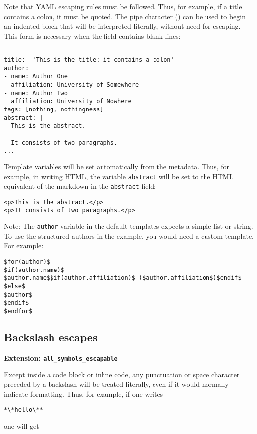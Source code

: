 \documentclass[]{article}
\begin{document}
Note that YAML escaping rules must be followed. Thus, for example, if a
title contains a colon, it must be quoted. The pipe character
(\texttt{\textbar{}}) can be used to begin an indented block that will
be interpreted literally, without need for escaping. This form is
necessary when the field contains blank lines:

\begin{verbatim}
---
title:  'This is the title: it contains a colon'
author:
- name: Author One
  affiliation: University of Somewhere
- name: Author Two
  affiliation: University of Nowhere
tags: [nothing, nothingness]
abstract: |
  This is the abstract.

  It consists of two paragraphs.
...
\end{verbatim}

Template variables will be set automatically from the metadata. Thus,
for example, in writing HTML, the variable \texttt{abstract} will be set
to the HTML equivalent of the markdown in the \texttt{abstract} field:

\begin{verbatim}
<p>This is the abstract.</p>
<p>It consists of two paragraphs.</p>
\end{verbatim}

Note: The \texttt{author} variable in the default templates expects a
simple list or string. To use the structured authors in the example, you
would need a custom template. For example:

\begin{verbatim}
$for(author)$
$if(author.name)$
$author.name$$if(author.affiliation)$ ($author.affiliation$)$endif$
$else$
$author$
$endif$
$endfor$
\end{verbatim}

\subsection{Backslash escapes}

\textbf{Extension: \texttt{all\_symbols\_escapable}}

Except inside a code block or inline code, any punctuation or space
character preceded by a backslash will be treated literally, even if it
would normally indicate formatting. Thus, for example, if one writes

\begin{verbatim}
*\*hello\**
\end{verbatim}

one will get
\end{document}
